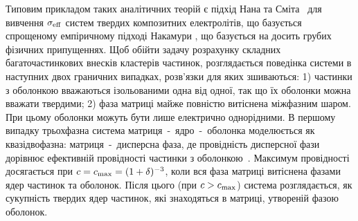\documentclass[14pt,twoside]{vakthesis}
\begin{document}
Типовим прикладом таких аналітичних теорій є підхід Нана та Сміта~\cite{Nan1987, NanC.-W.1991, Nan1993} для вивчення $\sigma_{\rm eff}$ систем твердих композитних електролітів, що базується спрощеному емпіричному підході Накамури \cite{Nakamura1984}, що базується на досить грубих фізичних припущеннях.
Щоб обійти задачу розрахунку складних багаточастинкових внесків кластерів частинок, розглядається поведінка системи в наступних двох граничних випадках, розв'язки для яких зшиваються: 1) частинки з оболонкою вважаються ізольованими одна від одної, так що їх оболонки можна вважати твердими; 2) фаза матриці майже повністю витіснена міжфазним шаром. При цьому оболонки можуть бути лише електрично однорідними. 
В першому випадку трьохфазна система матриця~-~ядро~-~оболонка моделюється як квазідвофазна: матриця~-~дисперсна фаза, де провідність дисперсної фази дорівнює ефективній провідності частинки з оболонкою~\cite{Maxwell1892, Brailsford1986, Chettiar2012}.
Максимум провідності досягається при  $c = c_{\rm max} = (1+\delta)^{-3}$, коли вся фаза матриці витіснена фазами ядер частинок та оболонок. 
Після цього (при $c > c_{\rm max}$) система розглядається, як сукупність твердих ядер частинок, які знаходяться в матриці, утвореній фазою оболонок. %
\end{document}
